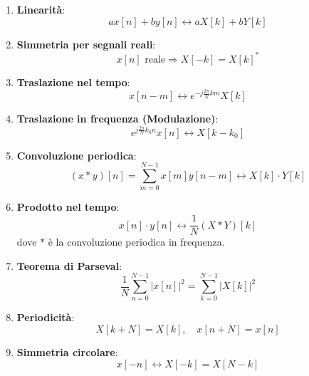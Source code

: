 \documentclass{article}
\theoremstyle{definition}
\begin{document}
	\begin{enumerate}
		\item \textbf{Linearità}:
		\[
		a x[n] + b y[n] \leftrightarrow a X[k] + b Y[k]
		\]
		
		\item \textbf{Simmetria per segnali reali}:
		\[
		x[n] \text{ reale} \Rightarrow X[-k] = X[k]^*
		\]
		
		\item \textbf{Traslazione nel tempo}:
		\[
		x[n - m] \leftrightarrow e^{-j \frac{2\pi}{N} k m} X[k]
		\]
		
		\item \textbf{Traslazione in frequenza (Modulazione)}:
		\[
		e^{j \frac{2\pi}{N} k_0 n} x[n] \leftrightarrow X[k - k_0]
		\]
		
		\item \textbf{Convoluzione periodica}:
		\[
		(x \ast y)[n] = \sum_{m=0}^{N-1} x[m] y[n - m] \leftrightarrow X[k] \cdot Y[k]
		\]
		
		\item \textbf{Prodotto nel tempo}:
		\[
		x[n] \cdot y[n] \leftrightarrow \frac{1}{N} (X \ast Y)[k]
		\]
		dove \(\ast\) è la convoluzione periodica in frequenza.
		
	
		
		\item \textbf{Teorema di Parseval}:
		\[
		\frac{1}{N} \sum_{n=0}^{N-1} |x[n]|^2 = \sum_{k=0}^{N-1} |X[k]|^2
		\]
		
		\item \textbf{Periodicità}:
		\[
		X[k + N] = X[k], \quad x[n + N] = x[n]
		\]
		
		\item \textbf{Simmetria circolare}:
		\[
		x[-n] \leftrightarrow X[-k] = X[N - k]
		\]
	\end{enumerate}
	\newpage
\end{document}
